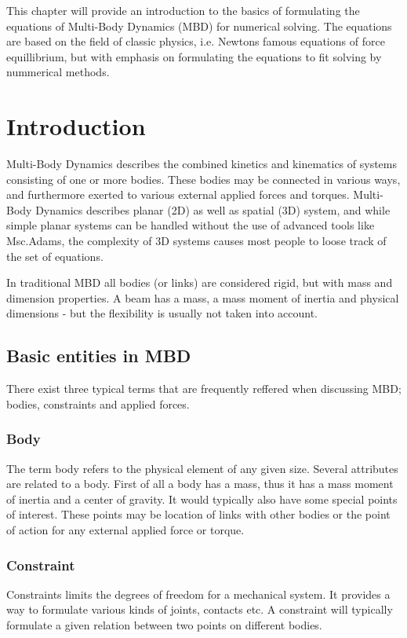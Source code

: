 \par	This chapter will provide an introduction to the basics of formulating the equations of Multi-Body Dynamics
	(MBD) for numerical solving. The equations are based on the field of classic physics, i.e. Newtons famous equations
	of force equillibrium, but with emphasis on formulating the equations to fit solving by nummerical methods.

	
\section{Introduction}	
\par Multi-Body Dynamics describes the combined kinetics and kinematics of systems consisting of one or more bodies.
	These bodies may be connected in various ways, and furthermore exerted to various external applied forces and 
	torques. Multi-Body Dynamics describes planar (2D) as well as spatial (3D) system, and while simple planar 
	systems can be handled without the use of advanced tools like Msc.Adams, the complexity of 3D systems 
	causes most people to loose track of the set of equations.
\par In traditional MBD all bodies (or links) are considered rigid, but with mass and dimension properties. A 
	beam has a mass, a mass moment of inertia and physical dimensions - but the flexibility is usually not 
	taken into account. 
	
\subsection{Basic entities in MBD}
\par There exist three typical terms that are frequently reffered when discussing MBD; bodies, constraints and applied
	forces.

\subsubsection{Body}
\par The term body refers to the physical element of any given size. Several attributes are related to a body. 
	First of all a body has a mass, thus it has a mass moment of inertia and a center of gravity. It would
	typically also have some special points of interest. These points may be location of links with other bodies
	or the point of action for any external applied force or torque.
\subsubsection{Constraint}
\par Constraints limits the degrees of freedom for a mechanical system. It provides a way to formulate various
	kinds of joints, contacts etc. A constraint will typically formulate a given relation between two points
	on different bodies.
